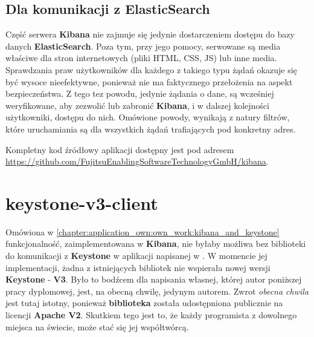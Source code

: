     \subsection{Dla komunikacji z ElasticSearch}
    Część serwera \textbf{Kibana} nie zajmuje się jedynie dostarczeniem dostępu do bazy danych
    \textbf{ElasticSearch}. Poza tym, przy jego pomocy, serwowane są media właściwe dla stron internetowych
    (pliki HTML, CSS, JS) lub inne media. Sprawdzania praw użytkowników dla
    każdego z takiego typu żądań okazuje się być wysoce nieefektywne, ponieważ nie ma faktycznego
    przełożenia na aspekt bezpieczeństwa. Z tego tez powodu, jedynie żądania o dane, są wcześniej 
    weryfikowane, aby zezwolić lub zabronić \textbf{Kibana}, i w dalszej kolejności użytkowniki,
    dostępu do nich. Omówione powody, wynikają z natury filtrów, które uruchamiania są dla 
    wszystkich żądań trafiających pod konkretny adres.

Kompletny kod źródłowy aplikacji dostępny jest pod adresem \url{https://github.com/FujitsuEnablingSoftwareTechnologyGmbH/kibana}.

\section{keystone-v3-client}
Omówiona w \ref{chapter:application_own:own_work:kibana_and_keystone} funkcjonalność, zaimplementowana w \textbf{Kibana}, nie byłaby możliwa
bez biblioteki do komunikacji z \textbf{Keystone} w aplikacji napisanej w .
W momencie jej implementacji, żadna z istniejących bibliotek nie wspierała nowej wersji \textbf{Keystone} - \textbf{V3}. 
Było to bodźcem dla napisania własnej, której autor poniższej pracy dyplomowej, jest, na obecną chwilę, jedynym autorem. Zwrot \textit{obecna chwila}
jest tutaj istotny, ponieważ \textbf{biblioteka} została udostępniona publicznie na licencji \textbf{Apache V2}. Skutkiem tego jest to, że
każdy programista z dowolnego miejsca na świecie, może stać się jej współtwórcą. 

